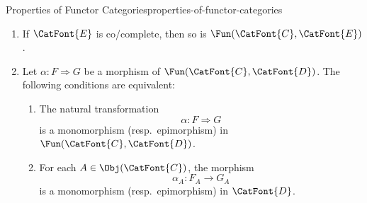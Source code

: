 \begin{proposition}{Properties of Functor Categories}{properties-of-functor-categories}
\begin{enumerate}
\[                \to
                \Fun(\CatFont{C},\CatFont{D})
            \]%
            be a diagram in $\Fun(\CatFont{C},\CatFont{D})$. We have isomorphisms
            \begin{align*}
                \lim(D)_{A}   &\cong \lim_{i\in\CatFont{I}}(D_{i}(A)),\\
                \colim(D)_{A} &\cong \colim_{i\in\CatFont{I}}(D_{i}(A)),
            \end{align*}
            naturally in $A\in\Obj(\CatFont{C})$.
        \item\label{properties-of-functor-categories-interaction-with-co-cocompleteness}If $\CatFont{E}$ is co/complete, then so is $\Fun(\CatFont{C},\CatFont{E})$.
        \item\label{properties-of-functor-categories-monomorphisms-and-epimorphisms}Let $\alpha\colon F\Longrightarrow G$ be a morphism of $\Fun(\CatFont{C},\CatFont{D})$. The following conditions are equivalent:
            \begin{enumerate}
                \item\label{properties-of-functor-categories-monomorphisms-and-epimorphisms-a}The natural transformation
                    \[
                        \alpha
                        \colon
                        F
                        \Longrightarrow
                        G
                    \]%
                    is a monomorphism (resp.\ epimorphism) in $\Fun(\CatFont{C},\CatFont{D})$.
                \item\label{properties-of-functor-categories-monomorphisms-and-epimorphisms-b}For each $A\in\Obj(\CatFont{C})$, the morphism
                    \[
                        \alpha_{A}
                        \colon
                        F_{A}
                        \to
                        G_{A}
                    \]%
                    is a monomorphism (resp.\ epimorphism) in $\CatFont{D}$.
            \end{enumerate}
    \end{enumerate}
\end{proposition}
